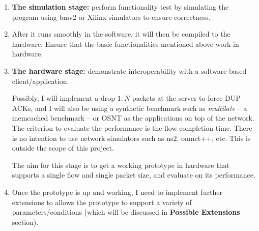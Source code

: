 \begin{enumerate}
\begin{itemize}
	\end{itemize}
	
	\item \textbf{The simulation stage:} perform functionality test by simulating the program using bmv2 or Xilinx simulators to ensure correctness. 
	
	\item After it runs smoothly in the software, it will then be compiled to the hardware. Ensure that the basic functionalities mentioned above work in hardware.
	
	\item \textbf{The hardware stage:} demonstrate interoperability with a software-based client/application.
	
	Possibly, I will implement a drop $1:N$ packets at the server to force DUP ACKs, and I will also be using a synthetic benchmark such as \emph{multilate} \cite{multilate} -- a memcached benchmark -- or OSNT \cite{osnt} as the applications on top of the network. The criterion to evaluate the performance is the flow completion time. There is no intention to use network simulators such as ns2, omnet++, etc. This is outside the scope of this project.
	
	The aim for this stage is to get a working prototype in hardware that supports a single flow and single packet size, and evaluate on its performance.
	
	\item Once the prototype is up and working, I need to implement further extensions to allows the prototype to support a variety of parameters/conditions (which will be discussed in \textbf{Possible Extensions} section).
		
\end{enumerate}

